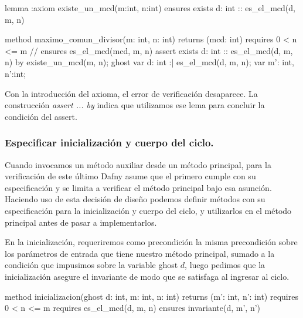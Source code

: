 \documentclass[12pt, a4paper, openany, fleqn]{book}
\begin{document}
    \begin{greenbox}
    \begin{dafny}[gobble=8]
        lemma {:axiom} existe_un_mcd(m:int, n:int)
            ensures exists d: int :: es_el_mcd(d, m, n)

        method maximo_comun_divisor(m: int, n: int) returns (mcd: int)
            requires 0 < n <= m
            // ensures es_el_mcd(mcd, m, n)
        {
            assert exists d: int :: es_el_mcd(d, m, n) by {
                existe_un_mcd(m, n);
            }
            ghost var d: int :| es_el_mcd(d, m, n);
            var m': int, n':int;
        }
    \end{dafny}
    \end{greenbox}

    Con la introducción del axioma, el error de verificación desaparece. La construcción \textit{assert ... by} indica que utilizamos ese lema para concluir la condición del assert.

    \subsubsection{Especificar inicialización y cuerpo del ciclo.}

    Cuando invocamos un método auxiliar desde un método principal, para la verificación de este último Dafny asume que el primero cumple con su especificación y se limita a verificar el método principal bajo esa asunción. Haciendo uso de esta decisión de diseño podemos definir métodos con su especificación para la inicialización y cuerpo del ciclo, y utilizarlos en el método principal antes de pasar a implementarlos.

    En la inicialización, requeriremos como precondición la misma precondición sobre los parámetros de entrada que tiene nuestro método principal, sumado a la condición que impusimos sobre la variable ghost $d$, luego pedimos que la inicialización asegure el invariante de modo que se satisfaga al ingresar al ciclo.

    \begin{greenbox}
    \begin{dafny}[gobble=8]
        method inicializacion(ghost d: int, m: int, n: int)
            returns (m': int, n': int)
            requires 0 < n <= m
            requires es_el_mcd(d, m, n)
            ensures invariante(d, m', n')
    \end{dafny}
    \end{greenbox}
\end{document}
